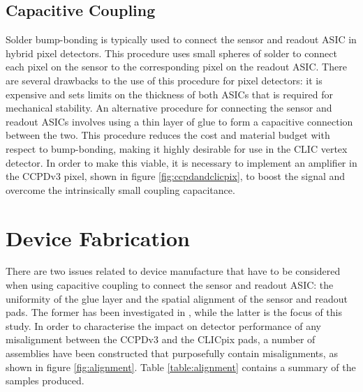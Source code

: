 \subsection{Capacitive Coupling}

Solder bump-bonding is typically used to connect the sensor and readout ASIC in hybrid pixel detectors.  This procedure uses small spheres of solder to connect each pixel on the sensor to the corresponding pixel on the readout ASIC.  There are several drawbacks to the use of this procedure for pixel detectors: it is expensive and sets limits on the thickness of both ASICs that is required for mechanical stability.  An alternative procedure for connecting the sensor and readout ASICs involves using a thin layer of glue to form a capacitive connection between the two.  This procedure reduces the cost and material budget with respect to bump-bonding, making it highly desirable for use in the CLIC vertex detector. In order to make this viable, it is necessary to implement an amplifier in the CCPDv3 pixel, shown in figure \ref{fig:ccpdandclicpix}, to boost the signal and overcome the intrinsically small coupling capacitance. 


\section{Device Fabrication}

There are two issues related to device manufacture that have to be considered when using capacitive coupling to connect the sensor and readout ASIC: the uniformity of the glue layer and the spatial alignment of the sensor and readout pads.  The former has been investigated in \cite{FabricationNote}, while the latter is the focus of this study.  In order to characterise the impact on detector performance of any misalignment between the CCPDv3 and the CLICpix pads, a number of assemblies have been constructed that purposefully contain misalignments, as shown in figure \ref{fig:alignment}.  Table \ref{table:alignment} contains a summary of the samples produced.

